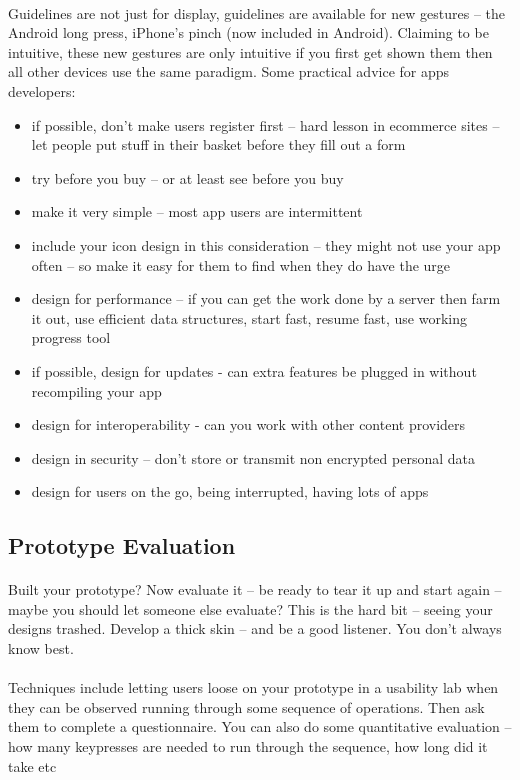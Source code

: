 \paragraph{} Guidelines are not just for display, guidelines are available for new gestures – the Android long press, iPhone’s pinch (now included in Android). Claiming to be intuitive, these new gestures are only intuitive if you first get shown them then all other devices use the same paradigm.
Some practical advice for apps developers:
\begin{itemize}
\item if possible, don't make users register first – hard lesson in ecommerce sites – let people put stuff in their basket before they fill out a form
\item try before you buy – or at least see before you buy
\item make it very simple – most app users are intermittent
\item include your icon design in this consideration – they might not use your app often – so make it easy for them to find when they do have the urge
\item design for performance – if you can get the work done by a server then farm it out, use efficient data structures, start fast, resume fast, use working progress tool
\item if possible, design for updates  - can extra features be plugged in without recompiling your app
\item design for interoperability  - can you work with other content providers
\item design in security – don't store or transmit non encrypted personal data
\item design for users on the go, being interrupted, having lots of apps
\end{itemize}

\subsection{Prototype Evaluation}
\paragraph{} Built your prototype? Now evaluate it – be ready to tear it up and start again – maybe you should let someone else evaluate? This is the hard bit – seeing your designs trashed. Develop a thick skin – and be a good listener. You don't always know best.

\paragraph{} Techniques include letting users loose on your prototype in a usability lab when they can be observed running through some sequence of operations. Then ask them to complete a questionnaire. You can also do some quantitative evaluation – how many keypresses are needed to run through the sequence, how long did it take etc

